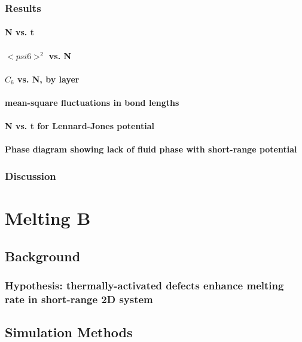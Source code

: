 \documentclass[pre,preprint]{revtex4-1}
\begin{document}
\subsubsection{Results}
\label{sec-1.3.6}
\paragraph{N vs. t}
\label{sec-1.3.6.1}
\paragraph{$< psi6 >^2$ vs. N}
\label{sec-1.3.6.2}
\paragraph{$C_6$ vs. N, by layer}
\label{sec-1.3.6.3}
\paragraph{mean-square fluctuations in bond lengths}
\label{sec-1.3.6.4}
\paragraph{N vs. t for Lennard-Jones potential}
\label{sec-1.3.6.5}
\paragraph{Phase diagram showing lack of fluid phase with short-range potential}
\label{sec-1.3.6.6}
\subsubsection{Discussion}
\label{sec-1.3.7}
\section{Melting B}
\label{sec-2}
\subsection{Background}
\label{sec-2.1}
\subsubsection{Hypothesis: thermally-activated defects enhance melting rate in short-range 2D system}
\label{sec-2.1.1}
\subsection{Simulation Methods}
\label{sec-2.2}
\end{document}
